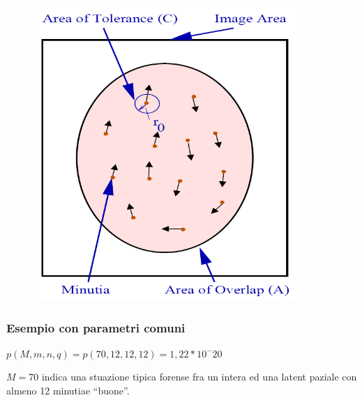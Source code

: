 \documentclass{report}
\begin{document}
\begin{figure}[ht]
    \centering
    \includegraphics[width=0.5\linewidth]{images/unicita.png}
\end{figure}

\subsubsection{Esempio con parametri comuni}

$p(M,m,n,q) = p(70, 12, 12, 12) = 1,22 * 10^-20$

\noindent $M=70$ indica una stuazione tipica forense fra un intera ed una latent
paziale con almeno 12 minutiae “buone”.
\end{document}
